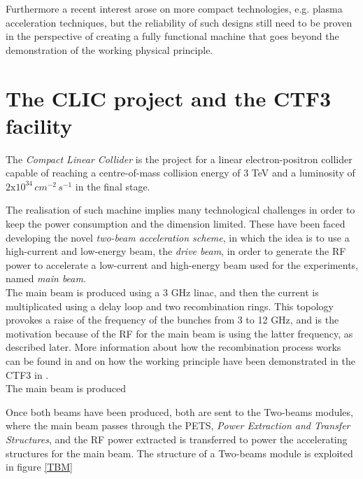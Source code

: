 Furthermore a recent interest arose on more compact technologies, e.g. plasma acceleration techniques, but the reliability of such designs still need to be proven in the perspective of creating a fully functional machine that goes beyond the demonstration of the working physical principle.



\section{The CLIC project and the CTF3 facility}

The \textit{Compact Linear Collider} is the project for a linear electron-positron collider capable of reaching a centre-of-mass collision energy of 3 TeV and a luminosity of $2\text{x}10^{34} \, cm^{-2} \, s^{-1}$ in the final stage.

The realisation of such machine implies many technological challenges in order to keep the power consumption and the dimension limited. These have been faced developing the novel \textit{two-beam acceleration scheme}, in which the idea is to use a high-current and low-energy beam, the \textit{drive beam}, in order to generate the RF power to accelerate a low-current and high-energy beam used for the experiments, named \textit{main beam}. \\
The main beam is produced using a 3 GHz linac, and then the current is multiplicated using a delay loop and two recombination rings. This topology provokes a raise of the frequency of the bunches from 3 to 12 GHz, and is the motivation because of the RF for the main beam is using the latter frequency, as described later. More information about how the recombination process works can be found in \cite{CLIC:cdr} and on how the working principle have been demonstrated in the CTF3 in \cite{CTF:drive_beam}.\\
The main beam is produced %
\cite{boh}




Once both beams have been produced, both are sent to the Two-beams modules, where the main beam passes through the PETS, \textit{Power Extraction and Transfer Structures}, and the RF power extracted is transferred to power the accelerating structures for the main beam. The structure of a Two-beams module is exploited in figure \ref{TBM}




